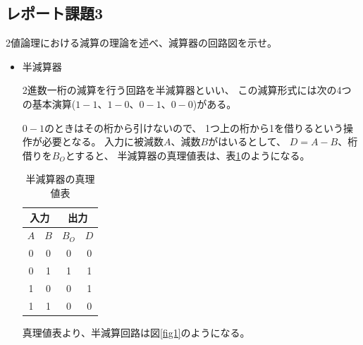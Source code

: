 \documentclass[12pt]{jarticle}
\begin{document}
\subsection{レポート課題3}
\begin{shadebox}
    2値論理における減算の理論を述べ、減算器の回路図を示せ。
\end{shadebox}
\begin{itemize}
    \item 半減算器

          2進数一桁の減算を行う回路を半減算器といい、
          この減算形式には次の4つの基本演算($1-1、1-0、0-1、0-0$)がある。

          $0-1$のときはその桁から引けないので、
          1つ上の桁から1を借りるという操作が必要となる。
          入力に被減数$A$、減数$B$がはいるとして、
          $D = A - B$、桁借りを$B_O$とすると、
          半減算器の真理値表は、表\ref{repotbl4}のようになる。

          \begin{table}[h]
              \caption{半減算器の真理値表}
              \begin{center}
                  \begin{tabular}{|cc|cc|}
                      \hline
                      \multicolumn{2}{|c|}{入力} & \multicolumn{2}{|c|}{出力}               \\
                      \hline
                      $A$                        & $B$                        & $B_O$ & $D$ \\
                      \hline
                      0                          & 0                          & 0     & 0   \\
                      0                          & 1                          & 1     & 1   \\
                      1                          & 0                          & 0     & 1   \\
                      1                          & 1                          & 0     & 0   \\
                      \hline
                  \end{tabular}
              \end{center}
              \label{repotbl4}
          \end{table}

          真理値表より、半減算回路は図\ref{fig1}のようになる。


\end{itemize}
\end{document}
